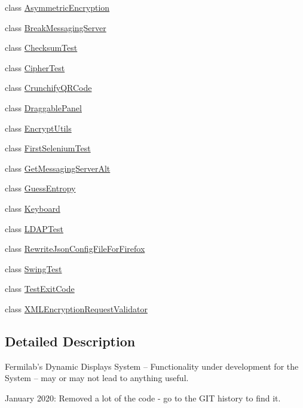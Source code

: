 \begin{DoxyCompactItemize}
\item 
class \hyperlink{classgov_1_1fnal_1_1ppd_1_1dd_1_1testing_1_1AsymmetricEncryption}{Asymmetric\-Encryption}
\item 
class \hyperlink{classgov_1_1fnal_1_1ppd_1_1dd_1_1testing_1_1BreakMessagingServer}{Break\-Messaging\-Server}
\item 
class \hyperlink{classgov_1_1fnal_1_1ppd_1_1dd_1_1testing_1_1ChecksumTest}{Checksum\-Test}
\item 
class \hyperlink{classgov_1_1fnal_1_1ppd_1_1dd_1_1testing_1_1CipherTest}{Cipher\-Test}
\item 
class \hyperlink{classgov_1_1fnal_1_1ppd_1_1dd_1_1testing_1_1CrunchifyQRCode}{Crunchify\-Q\-R\-Code}
\item 
class \hyperlink{classgov_1_1fnal_1_1ppd_1_1dd_1_1testing_1_1DraggablePanel}{Draggable\-Panel}
\item 
class \hyperlink{classgov_1_1fnal_1_1ppd_1_1dd_1_1testing_1_1EncryptUtils}{Encrypt\-Utils}
\item 
class \hyperlink{classgov_1_1fnal_1_1ppd_1_1dd_1_1testing_1_1FirstSeleniumTest}{First\-Selenium\-Test}
\item 
class \hyperlink{classgov_1_1fnal_1_1ppd_1_1dd_1_1testing_1_1GetMessagingServerAlt}{Get\-Messaging\-Server\-Alt}
\item 
class \hyperlink{classgov_1_1fnal_1_1ppd_1_1dd_1_1testing_1_1GuessEntropy}{Guess\-Entropy}
\item 
class \hyperlink{classgov_1_1fnal_1_1ppd_1_1dd_1_1testing_1_1Keyboard}{Keyboard}
\item 
class \hyperlink{classgov_1_1fnal_1_1ppd_1_1dd_1_1testing_1_1LDAPTest}{L\-D\-A\-P\-Test}
\item 
class \hyperlink{classgov_1_1fnal_1_1ppd_1_1dd_1_1testing_1_1RewriteJsonConfigFileForFirefox}{Rewrite\-Json\-Config\-File\-For\-Firefox}
\item 
class \hyperlink{classgov_1_1fnal_1_1ppd_1_1dd_1_1testing_1_1SwingTest}{Swing\-Test}
\item 
class \hyperlink{classgov_1_1fnal_1_1ppd_1_1dd_1_1testing_1_1TestExitCode}{Test\-Exit\-Code}
\item 
class \hyperlink{classgov_1_1fnal_1_1ppd_1_1dd_1_1testing_1_1XMLEncryptionRequestValidator}{X\-M\-L\-Encryption\-Request\-Validator}
\end{DoxyCompactItemize}


\subsection{Detailed Description}
Fermilab's Dynamic Displays System -- Functionality under development for the System -- may or may not lead to anything useful.

January 2020\-: Removed a lot of the code -\/ go to the G\-I\-T history to find it. 